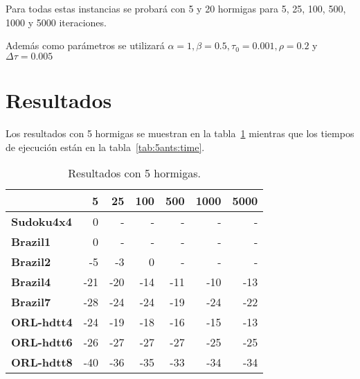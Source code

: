 \documentclass[letter, 10pt]{article}
\renewcommand{\bf}[1]{\textbf{#1}}
\begin{document}
Para todas estas instancias se probará con 5 y 20 hormigas para 5, 25, 100,
500, 1000 y 5000 iteraciones.

Además como parámetros se utilizará $\alpha = 1, \beta = 0.5, \tau_0 = 0.001,
\rho = 0.2$ y $\Delta\tau = 0.005$

\section{Resultados}\label{sec:res}
Los resultados con 5 hormigas se muestran en la tabla~\ref{tab:5ants} mientras
que los tiempos de ejecución están en la tabla~\ref{tab:5ants:time}.

\begin{table}[h]
\centering
\begin{tabular}{|l|r|r|r|r|r|r|}
  \hline
                 & 5   & 25  & 100 & 500 & 1000 & 5000  \\\hline
  \bf{Sudoku4x4} & 0   & -   & -   & -   & -    & -     \\\hline
  \bf{Brazil1}   & 0   & -   & -   & -   & -    & -     \\\hline
  \bf{Brazil2}   & -5  & -3  & 0   & -   & -    & -     \\\hline
  \bf{Brazil4}   & -21 & -20 & -14 & -11 & -10  & -13   \\\hline
  \bf{Brazil7}   & -28 & -24 & -24 & -19 & -24  & -22   \\\hline
  \bf{ORL-hdtt4} & -24 & -19 & -18 & -16 & -15  & -13   \\\hline
  \bf{ORL-hdtt6} & -26 & -27 & -27 & -27 & -25  & -25   \\\hline
  \bf{ORL-hdtt8} & -40 & -36 & -35 & -33 & -34  & -34   \\\hline
\end{tabular}
\caption{Resultados con 5 hormigas.}\label{tab:5ants}
\end{table}
\end{document}
